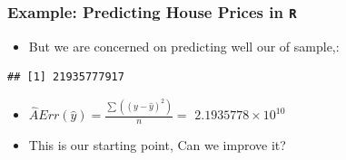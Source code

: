 \documentclass[
  shownotes,
  xcolor={svgnames},
  hyperref={colorlinks,citecolor=DarkBlue,linkcolor=DarkRed,urlcolor=DarkBlue}
  ]{beamer}
\newenvironment{Shaded}{\begin{snugshade}}{\end{snugshade}}
\newcommand{\DataTypeTok}[1]{\textcolor[rgb]{0.13,0.29,0.53}{#1}}
\newcommand{\DecValTok}[1]{\textcolor[rgb]{0.00,0.00,0.81}{#1}}
\newcommand{\KeywordTok}[1]{\textcolor[rgb]{0.13,0.29,0.53}{\textbf{#1}}}
\newcommand{\NormalTok}[1]{#1}
\newcommand{\OperatorTok}[1]{\textcolor[rgb]{0.81,0.36,0.00}{\textbf{#1}}}
\begin{document}
\begin{frame}[fragile]
\frametitle{Example: Predicting House Prices in \texttt{R}}

\begin{itemize}
  \item But we are concerned on predicting well our of sample,:
\end{itemize}
\bigskip
\begin{Shaded}
\footnotesize
{}
\end{Shaded}

\begin{tiny}
\begin{verbatim}
## [1] 21935777917
\end{verbatim}
\end{tiny}

\begin{itemize}
  \item $\hat AErr(\hat y)=\frac{\sum((y-\hat{y})^2)}{n}=$ \ensuremath{2.1935778\times 10^{10}}
  \item This is our starting point, Can we improve it?
\end{itemize}
  
\end{frame}

\end{document}
